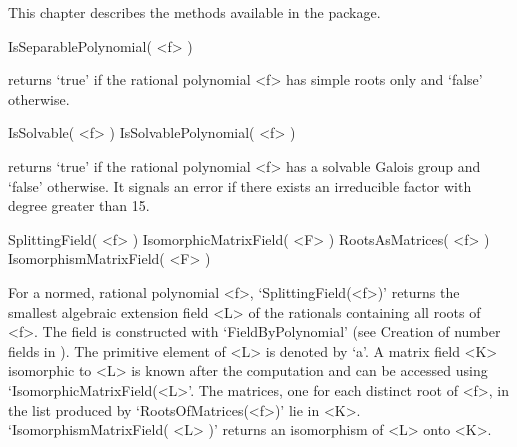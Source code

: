 


This chapter describes the methods available in the {\Radiroot}
package.
 

\> IsSeparablePolynomial( <f> )

returns `true' if the rational polynomial <f> has simple roots only
and `false' otherwise.

\> IsSolvable( <f> )
\> IsSolvablePolynomial( <f> )

returns `true' if the rational polynomial <f> has a solvable Galois group and
`false' otherwise. It signals an error if there exists an irreducible factor
with degree greater than 15.

\> SplittingField( <f> )
\> IsomorphicMatrixField( <F> )
\> RootsAsMatrices( <f> )
\> IsomorphismMatrixField( <F> )

For a normed, rational polynomial <f>, `SplittingField(<f>)' returns the
smallest algebraic extension field <L> of the rationals containing all
roots of <f>. The field is constructed with `FieldByPolynomial' (see
Creation of number fields in \Alnuth). The primitive element of <L> is
denoted by `a'. A matrix field <K> isomorphic to <L> is known after
the computation and can be accessed using `IsomorphicMatrixField(<L>'.
The matrices, one for each distinct root of <f>, in the list produced
by `RootsOfMatrices(<f>)' lie in <K>. `IsomorphismMatrixField( <L> )'
returns an isomorphism of <L> onto <K>.

